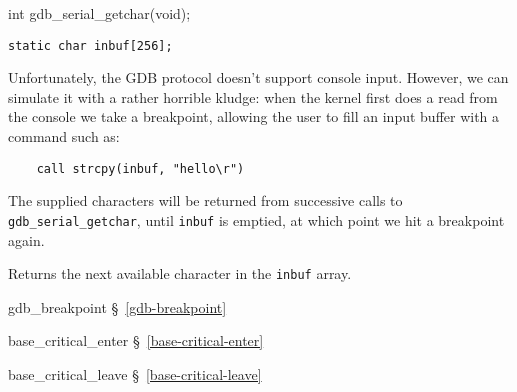 \label{gdb-serial-getchar}
\begin{apisyn}

	\funcproto int gdb_serial_getchar(void);

	{\tt static char inbuf[256];}
\end{apisyn}
\begin{apidesc}
	Unfortunately, the GDB protocol doesn't support console input.
	However, we can simulate it with a rather horrible kludge:
	when the kernel first does a read from the console
	we take a breakpoint, allowing the user to fill an input buffer
	with a command such as:

	\begin{codefrag}
	\begin{verbatim}
	call strcpy(inbuf, "hello\r")
	\end{verbatim}
	\end{codefrag}

	The supplied characters will be returned from successive calls
	to {\tt gdb_serial_getchar}, until {\tt inbuf} is emptied,
	at which point we hit a breakpoint again.
\end{apidesc}
\begin{apiret}
	Returns the next available character in the {\tt inbuf} array.
\end{apiret}
\begin{apidep}
	\item[gdb_breakpoint]		\S~\ref{gdb-breakpoint}
	\item[base_critical_enter]	\S~\ref{base-critical-enter}
	\item[base_critical_leave]	\S~\ref{base-critical-leave}
\end{apidep}

